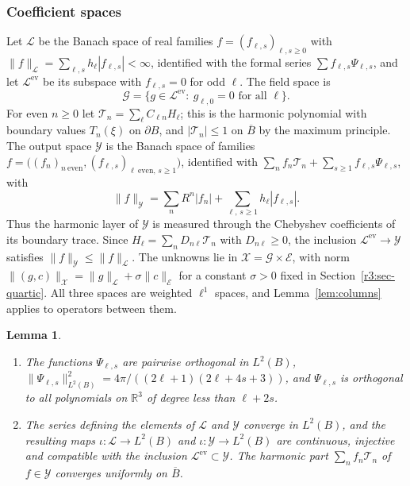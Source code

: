 \documentclass[11pt]{amsart}
\newtheorem{lemma}[theorem]{Lemma}
\theoremstyle{definition}
\theoremstyle{remark}
\numberwithin{equation}{section}
\newcommand{\R}{\mathbb{R}}
\newcommand{\Gc}{\mathcal{G}}
\newcommand{\nrm}[1]{\lVert #1\rVert}
\begin{document}
\subsubsection*{Coefficient spaces}
Let $\mathcal L$ be the Banach space of real families $f=(f_{\ell,s})_{\ell,s\geq0}$ with $\nrm f_{\mathcal L}=\sum_{\ell,s}h_\ell|f_{\ell,s}|<\infty$, identified with the formal series $\sum f_{\ell,s}\Psi_{\ell,s}$, and let $\mathcal L^{\mathrm{ev}}$ be its subspace with $f_{\ell,s}=0$ for odd $\ell$. The field space is
\[
\Gc=\{g\in\mathcal L^{\mathrm{ev}}:\ g_{\ell,0}=0\text{ for all }\ell\}.
\]
For even $n\geq0$ let $\mathcal T_n=\sum_\ell C_{\ell n}H_\ell$; this is the harmonic polynomial with boundary values $T_n(\xi)$ on $\partial B$, and $|\mathcal T_n|\leq1$ on $\overline B$ by the maximum principle. The output space $\mathcal Y$ is the Banach space of families $f=\big((f_n)_{n\ \mathrm{even}},(f_{\ell,s})_{\ell\ \mathrm{even},\,s\geq1}\big)$, identified with $\sum_nf_n\mathcal T_n+\sum_{s\geq1}f_{\ell,s}\Psi_{\ell,s}$, with
\[
\nrm f_{\mathcal Y}=\sum_nR^n|f_n|+\sum_{\ell,\,s\geq1}h_\ell|f_{\ell,s}| .
\]
Thus the harmonic layer of $\mathcal Y$ is measured through the Chebyshev coefficients of its boundary trace. Since $H_\ell=\sum_nD_{n\ell}\mathcal T_n$ with $D_{n\ell}\geq0$, the inclusion $\mathcal L^{\mathrm{ev}}\to\mathcal Y$ satisfies $\nrm f_{\mathcal Y}\leq\nrm f_{\mathcal L}$. The unknowns lie in $\mathcal X=\Gc\times\mathcal E$, with norm $\nrm{(g,c)}_{\mathcal X}=\nrm g_{\mathcal L}+\sigma\nrm c_{\mathcal E}$ for a constant $\sigma>0$ fixed in Section~\ref{r3:sec-quartic}. All three spaces are weighted $\ell^1$ spaces, and Lemma~\ref{lem:columns} applies to operators between them.

\begin{lemma}\label{r3:lem-embed}
\begin{enumerate}[label=\textup{(\alph*)}]
\item The functions $\Psi_{\ell,s}$ are pairwise orthogonal in $L^2(B)$, $\nrm{\Psi_{\ell,s}}^2_{L^2(B)}=4\pi/((2\ell+1)(2\ell+4s+3))$, and $\Psi_{\ell,s}$ is orthogonal to all polynomials on $\R^3$ of degree less than $\ell+2s$.
\item The series defining the elements of $\mathcal L$ and $\mathcal Y$ converge in $L^2(B)$, and the resulting maps $\iota\colon\mathcal L\to L^2(B)$ and $\iota\colon\mathcal Y\to L^2(B)$ are continuous, injective and compatible with the inclusion $\mathcal L^{\mathrm{ev}}\subset\mathcal Y$. The harmonic part $\sum_nf_n\mathcal T_n$ of $f\in\mathcal Y$ converges uniformly on $\overline B$.
\end{enumerate}
\end{lemma}
\end{document}
